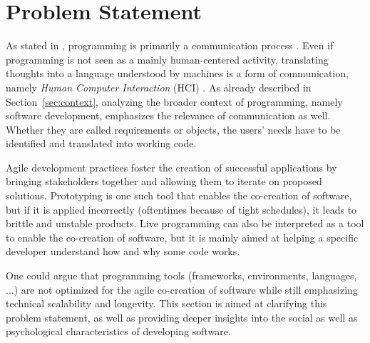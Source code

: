 

\section{Problem Statement}
\label{sec:problem-statement}
As stated in , programming is primarily a communication process \cite{anonymous_what_1967}.
Even if programming is not seen as a mainly human-centered activity, translating thoughts into a language understood by machines is a form of communication, namely \emph{Human Computer Interaction} (HCI) \cite{myers_past_2009}.
As already described in Section~\ref{sec:context}, analyzing the broader context of programming, namely software development, emphasizes the relevance of communication as well.
Whether they are called requirements or objects, the users' needs have to be identified and translated into working code.

Agile development practices foster the creation of successful applications by bringing stakeholders together and allowing them to iterate on proposed solutions.
Prototyping is one such tool that enables the co-creation of software, but if it is applied incorrectly (oftentimes because of tight schedules), it leads to brittle and unstable products.
Live programming can also be interpreted as a tool to enable the co-creation of software, but it is mainly aimed at helping a specific developer understand how and why some code works.

One could argue that programming tools (frameworks, environments, languages, ...) are not optimized for the agile co-creation of software while still emphasizing technical scalability and longevity.
This section is aimed at clarifying this problem statement, as well as providing deeper insights into the social as well as psychological characteristics of developing software.


